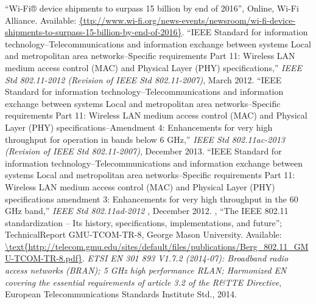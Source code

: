 %

\begin{thebibliography}{99.}%
``Wi-Fi® device shipments to surpass 15 billion by end of 2016'', Online, {Wi-Fi}  Alliance. Available:  \url{{ttp://www.wi-fi.org/news-events/newsroom/wi-fi-device-shipments-to-surpass-15-billion-by-end-of-2016}}.
``{IEEE Standard for information technology--Telecommunications and information exchange between systems Local and metropolitan area networks--Specific requirements Part 11: Wireless LAN medium access control (MAC) and Physical Layer (PHY) specifications},'' \emph{{IEEE Std 802.11-2012 (Revision of IEEE Std 802.11-2007)}}, March 2012.
``{IEEE Standard for information technology--Telecommunications and information exchange between systems Local and metropolitan area networks--Specific requirements Part 11: Wireless LAN medium access control (MAC) and Physical Layer (PHY) specifications}--Amendment 4: Enhancements for very high throughput for operation in bands below 6 GHz,'' \emph{{IEEE Std 802.11ac-2013 (Revision of IEEE Std 802.11-2007)}}, December 2013.
``{IEEE Standard for information technology--Telecommunications and information exchange between systems Local and metropolitan area networks--Specific requirements Part 11: Wireless LAN medium access control (MAC) and Physical Layer (PHY) specifications amendment 3: Enhancements for very high throughput in the 60 GHz band},'' \emph{{IEEE Std 802.11ad-2012 }},  December 2012.
, ``The  IEEE  802.11  standardization  – Its  history,  specifications,  implementations,  and  future''; TechnicalReport GMU-TCOM-TR-8,  George  Mason  University. 
Available: \url{\text{http://telecom.gmu.edu/sites/default/files/publications/Berg\_802.11\_GMU-TCOM-TR-8.pdf}}.
 \emph{ETSI EN 301 893 V1.7.2 (2014-07): Broadband radio access networks (BRAN);	5 GHz high performance RLAN; Harmonized EN covering the essential requirements of article 3.2 of the R\&TTE Directive}, European Telecommunications Standards Institute Std., 2014.
\end{thebibliography}
